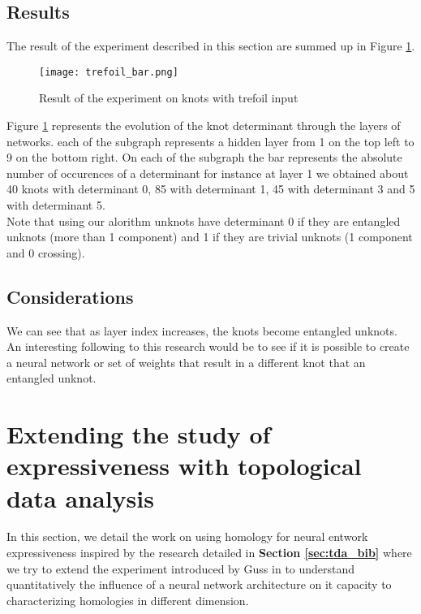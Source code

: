 \documentclass[12pt, a4paper]{article}
\begin{document}
\subsection{Results}

The result of the experiment described in this section are summed up in Figure \ref{fig:knot_results}.

\begin{figure}[H]
  \centering
  \texttt{[image: trefoil\_bar.png]}
  \caption{Result of the experiment on knots with trefoil input}
  \label{fig:knot_results}
\end{figure}

Figure \ref{fig:knot_results} represents the evolution of the knot determinant through the layers of networks. each of the subgraph represents a hidden layer from 1 on the top left to 9 on the bottom right. On each of the subgraph the bar represents the absolute number of occurences of a determinant for instance at layer 1 we obtained about 40 knots with determinant 0, 85 with determinant 1, 45 with determinant 3 and 5 with determinant 5.\\

Note that using our alorithm unknots have determinant 0 if they are entangled unknots (more than 1 component) and 1 if they are trivial unknots (1 component and 0 crossing).

\subsection{Considerations}

We can see that as layer index increases, the knots become entangled unknots. An interesting following to this research would be to see if it is possible to create a neural network or set of weights that result in a different knot that an entangled unknot. 

\newpage
\thispagestyle{empty}
\mbox{}
\newpage

\section{Extending the study of expressiveness with topological data analysis} 

In this section, we detail the work on using homology for neural entwork expressiveness inspired by the research detailed in \textbf{Section \ref{sec:tda_bib}} where we try to extend the experiment introduced by Guss in \cite{guss_characterizing_2018} to understand quantitatively the influence of a neural network architecture on it capacity to characterizing homologies in different dimension. 
\end{document}
